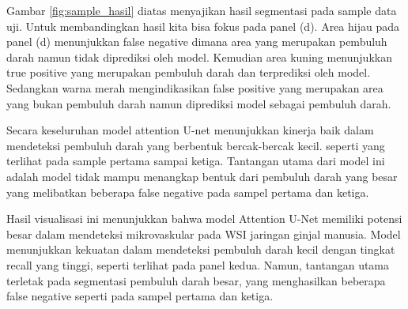 \noindent Gambar \ref{fig:sample_hasil} diatas menyajikan hasil segmentasi pada sample data uji. Untuk membandingkan hasil kita bisa fokus pada panel (d). Area hijau pada panel (d) menunjukkan false negative dimana area yang merupakan pembuluh darah namun tidak diprediksi oleh model. Kemudian area kuning menunjukkan true positive yang merupakan pembuluh darah dan terprediksi oleh model. Sedangkan warna merah mengindikasikan false positive yang merupakan area yang bukan pembuluh darah namun diprediksi model sebagai pembuluh darah.




\noindent Secara keseluruhan model attention U-net menunjukkan kinerja baik dalam mendeteksi pembuluh darah yang berbentuk bercak-bercak kecil. seperti yang terlihat pada sample pertama sampai ketiga. Tantangan utama dari model ini adalah model tidak mampu menangkap bentuk dari pembuluh darah yang besar yang melibatkan beberapa false negative pada sampel pertama dan ketiga.


\noindent Hasil visualisasi ini menunjukkan bahwa model Attention U-Net memiliki potensi besar dalam mendeteksi mikrovaskular pada WSI jaringan ginjal manusia. Model menunjukkan kekuatan dalam mendeteksi pembuluh darah kecil dengan tingkat recall yang tinggi, seperti terlihat pada panel kedua. Namun, tantangan utama terletak pada segmentasi pembuluh darah besar, yang menghasilkan beberapa false negative seperti pada sampel pertama dan ketiga.






